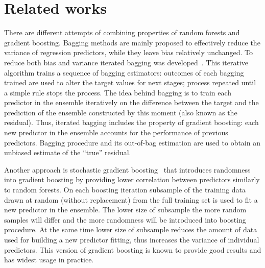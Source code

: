 \insertplotsforestnips

\clearpagebiblio 
\section{Related works}
There are different attempts of combining properties of random forests and gradient boosting.
Bagging methods are mainly proposed to effectively reduce the variance of regression predictors, while they leave bias relatively unchanged. 
To reduce both bias and variance iterated bagging was developed~\cite{key-iterated-bagging}. 
This iterative algorithm trains a sequence of bagging estimators: outcomes of each bagging trained are used to alter the target values for next stages; process repeated until a simple rule stops the process. 
The idea behind bagging is to train each predictor in the ensemble iteratively on the difference between the target and the prediction of the ensemble constructed by this moment (also known as the residual).
Thus, iterated bagging includes the property of gradient boosting: each new predictor in the ensemble accounts for the performance of previous predictors.
Bagging procedure and its out-of-bag estimation are used to obtain an unbiased estimate of the “true” residual. 

Another approach is stochastic gradient boosting~\cite{key-sgb} that introduces randomness into gradient boosting by providing lower correlation between predictors similarly to random forests. 
On each boosting iteration subsample of the training data drawn at random (without replacement) from the full training set is used to fit a new predictor in the ensemble. 
The lower size of subsample the more random samples will differ and the more randomness will be introduced into boosting procedure.
At the same time lower size of subsample reduces the amount of data used for building a new predictor fitting, thus increases the variance of individual predictors.
This version of gradient boosting is known to provide good results and has widest usage in practice.

